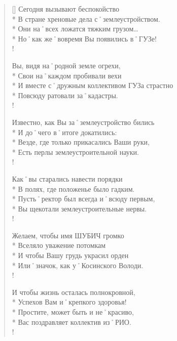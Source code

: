 \clearpage							%
\settowidth{\versewidth}{И вместе с˚дружным коллективом ГУЗа страстно}		%
\begin{verse}[\versewidth]
Сегодня вызывают беспокойство\\*
В стране хреновые дела с˚землеустройством.\\*
Они на˚всех ложатся тяжким грузом…\\* 
Но˚как же˚вовремя Вы появились в˚ГУЗе!\\!

\vin Вы, видя на˚родной земле огрехи,\\*
\vin Свои на˚каждом пробивали вехи \\*
\vin И вместе с˚дружным коллективом ГУЗа страстно \\*
\vin Повсюду ратовали за˚кадастры.\\!

Известно, как Вы за˚землеустройство бились \\*
И до˚чего в˚итоге докатились:\\*
Везде, где только прикасались Ваши руки,\\*
Есть перлы землеустроительной науки.\\!

\vin Как˚вы старались навести порядки \\*
\vin В полях, где положенье было гадким.\\*
\vin Пусть˚ректор был всегда и˚всюду первым,\\*
\vin Вы щекотали землеустроительные нервы.\\!

Желаем, чтобы имя ШУБИЧ громко \\*
Вселяло уважение потомкам \\*
И чтобы Вашу грудь украсил орден \\*
Или˚значок, как у˚Косинского Володи.\\!

\vin И чтобы жизнь осталась полнокровной,\\*
\vin Успехов Вам и˚крепкого здоровья!\\*
\vin Простите, может быть и не˚красиво,\\*
\vin Вас поздравляет коллектив из˚РИО. \\!

\end{verse}


